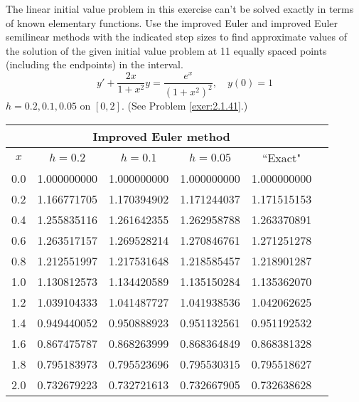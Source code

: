 \documentclass{ximera}
\begin{document}
\begin{problem}\label{exer:3.2.18} The linear initial value problem in this exercise can't be solved exactly in terms of known elementary functions. Use the improved Euler and improved Euler semilinear methods with the indicated step sizes to find approximate values of the solution of the given initial value problem at 11 equally spaced points (including the endpoints) in the interval.
$$y'+\frac{2x}{1+x^2}y=\frac{e^x}{(1+x^2)^2}, \quad y(0)=1$$
$h=0.2,0.1,0.05$ on $[0,2]$.
 (See Problem \ref{exer:2.1.41}.)

 \begin{solution}
     {\small
\begin{tabular}{|c|r|r|r|r|r|}
\hline
\multicolumn{5}{|c|}{Improved Euler method}\\\hline
\multicolumn{1}{|c|}{$x$}&
\multicolumn{1}{|c|}{$h=0.2$}&
\multicolumn{1}{|c|}{$h=0.1$}&
\multicolumn{1}{|c|}{$h=0.05$}&
\multicolumn{1}{|c|}{``Exact"}\\ \hline
0.0 & 1.000000000 & 1.000000000 & 1.000000000 & 1.000000000 \\
0.2 & 1.166771705 & 1.170394902 & 1.171244037 & 1.171515153 \\
0.4 & 1.255835116 & 1.261642355 & 1.262958788 & 1.263370891 \\
0.6 & 1.263517157 & 1.269528214 & 1.270846761 & 1.271251278 \\
0.8 & 1.212551997 & 1.217531648 & 1.218585457 & 1.218901287 \\
1.0 & 1.130812573 & 1.134420589 & 1.135150284 & 1.135362070 \\
1.2 & 1.039104333 & 1.041487727 & 1.041938536 & 1.042062625 \\
1.4 & 0.949440052 & 0.950888923 & 0.951132561 & 0.951192532 \\
1.6 & 0.867475787 & 0.868263999 & 0.868364849 & 0.868381328 \\
1.8 & 0.795183973 & 0.795523696 & 0.795530315 & 0.795518627 \\
2.0 & 0.732679223 & 0.732721613 & 0.732667905 & 0.732638628 \\
\hline
\end{tabular}}


\end{solution}
\end{problem}
\end{document}
